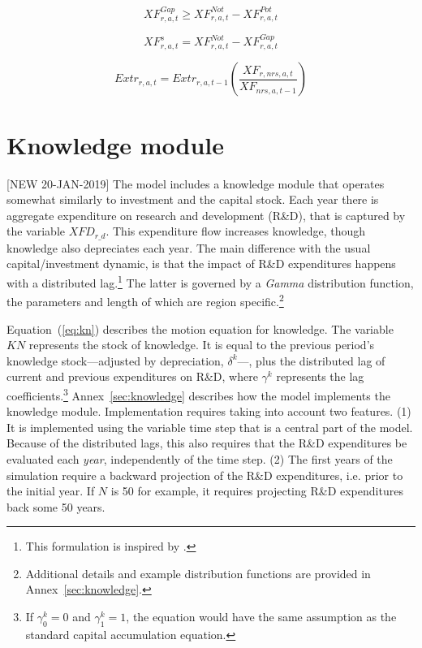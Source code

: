 \documentclass[11pt,letterpaper]{report}
\begin{document}
\begin{equation}
\label{eq:xfGap}
\mathit{XF}^{\mathit{Gap}}_{r,a,t} \ge \mathit{XF}^{\mathit{Not}}_{r,a,t} - \mathit{XF}^{\mathit{Pot}}_{r,a,t}
\end{equation}

\begin{equation}
\label{eq:xfsdepl}
\mathit{XF}^{\mathit{s}}_{r,a,t} = \mathit{XF}^{\mathit{Not}}_{r,a,t} - \mathit{XF}^{\mathit{Gap}}_{r,a,t}
\end{equation}

\begin{equation}
\label{eq:extr}
\mathit{Extr}_{r,a,t} = \mathit{Extr}_{r,a,t-1} \left(\frac{\mathit{XF}_{r,\mathit{nrs},a,t}}{\mathit{XF}_{\mathit{nrs},a,t-1}}\right)
\end{equation}

\section{Knowledge module}

[NEW 20-JAN-2019] The model includes a knowledge
module that operates somewhat similarly to investment
and the capital stock. Each year there is aggregate expenditure
on research and development (R\&D), that is captured
by the variable $\mathit{XFD}_{\mathit{r\_d}}$. This
expenditure flow increases knowledge, though knowledge
also depreciates each year. The main difference
with the usual capital/investment dynamic,
is that the impact
of R\&D expenditures happens with a distributed lag.\footnote{This
formulation is inspired by \cite{SmeetsKristkova2016}.}
The latter is governed by a \emph{Gamma} distribution
function, the parameters and length of which
are region specific.\footnote{Additional details
and example distribution functions are provided
in Annex~\ref{sec:knowledge}.}

Equation~(\ref{eq:kn}) describes the motion equation for knowledge.
The variable $\mathit{KN}$ represents
the stock of knowledge. It is equal to the previous
period's knowledge stock---adjusted by depreciation, $\delta^k$---,
plus the distributed lag of current
and previous expenditures on R\&D, where $\gamma^k$
represents the lag coefficients.\footnote{If
$\gamma^k_0=0$ and $\gamma^k_{1}=1$, the equation
would have the same assumption as the standard
capital accumulation equation.}
Annex~\ref{sec:knowledge} describes how the
model implements the knowledge module. Implementation
requires taking into account two features. (1) It is implemented
using the variable time step that is a central
part of the model. Because of the distributed
lags, this also requires that the R\&D expenditures
be evaluated each \emph{year}, independently of
the time step. (2) The first years of the simulation require
a backward projection of the R\&D expenditures,
i.e. prior to the initial year. If $N$ is 50
for example, it requires projecting R\&D
expenditures back some 50 years.
\end{document}
